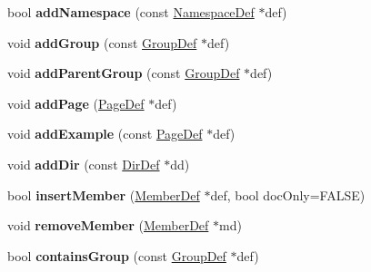 \begin{DoxyCompactItemize}
\item 
\hypertarget{class_group_def_abef69d12494e2e1e7e788bf6d9b9032f}{bool {\bfseries add\-Namespace} (const \hyperlink{class_namespace_def}{Namespace\-Def} $\ast$def)}\label{class_group_def_abef69d12494e2e1e7e788bf6d9b9032f}

\item 
\hypertarget{class_group_def_ae95a01367722f4c1feac0e995232e4ea}{void {\bfseries add\-Group} (const \hyperlink{class_group_def}{Group\-Def} $\ast$def)}\label{class_group_def_ae95a01367722f4c1feac0e995232e4ea}

\item 
\hypertarget{class_group_def_a772e44636e2f558472466e70ac3e46f5}{void {\bfseries add\-Parent\-Group} (const \hyperlink{class_group_def}{Group\-Def} $\ast$def)}\label{class_group_def_a772e44636e2f558472466e70ac3e46f5}

\item 
\hypertarget{class_group_def_a28718a777a0c246d08c23842741eb133}{void {\bfseries add\-Page} (\hyperlink{class_page_def}{Page\-Def} $\ast$def)}\label{class_group_def_a28718a777a0c246d08c23842741eb133}

\item 
\hypertarget{class_group_def_aa87b410d479ad62c8f69baef5e39d8de}{void {\bfseries add\-Example} (const \hyperlink{class_page_def}{Page\-Def} $\ast$def)}\label{class_group_def_aa87b410d479ad62c8f69baef5e39d8de}

\item 
\hypertarget{class_group_def_a674cfcae5032aa515086228ae2232d7b}{void {\bfseries add\-Dir} (const \hyperlink{class_dir_def}{Dir\-Def} $\ast$dd)}\label{class_group_def_a674cfcae5032aa515086228ae2232d7b}

\item 
\hypertarget{class_group_def_a8c2b76fd6ab6d3ba06c4067854e58c4b}{bool {\bfseries insert\-Member} (\hyperlink{class_member_def}{Member\-Def} $\ast$def, bool doc\-Only=F\-A\-L\-S\-E)}\label{class_group_def_a8c2b76fd6ab6d3ba06c4067854e58c4b}

\item 
\hypertarget{class_group_def_ae7bbe27bfcf2efed4a583ece2de5c381}{void {\bfseries remove\-Member} (\hyperlink{class_member_def}{Member\-Def} $\ast$md)}\label{class_group_def_ae7bbe27bfcf2efed4a583ece2de5c381}

\item 
\hypertarget{class_group_def_aabbaeae63edcd333a7456f38e1eac5fa}{bool {\bfseries contains\-Group} (const \hyperlink{class_group_def}{Group\-Def} $\ast$def)}\label{class_group_def_aabbaeae63edcd333a7456f38e1eac5fa}


\end{DoxyCompactItemize}
